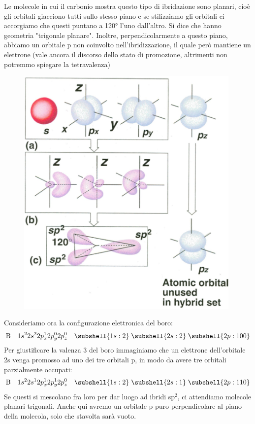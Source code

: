Le molecole in cui il carbonio mostra questo tipo di ibridazione sono planari, cioè gli orbitali giacciono tutti sullo stesso piano e se stilizziamo gli orbitali ci accorgiamo che questi puntano a 120° l'uno dall'altro. Si dice che hanno geometria "trigonale planare". Inoltre, perpendicolarmente a questo piano, abbiamo un orbitale p non coinvolto nell'ibridizzazione, il quale però mantiene un elettrone (vale ancora il discorso dello stato di promozione, altrimenti non potremmo spiegare la tetravalenza)

\begin{figure}[H]
    \centering
    \includegraphics[width=11cm]{immagini/orbitali-sp2.png}
\end{figure}

Consideriamo ora la configurazione elettronica del boro:
$$\text{B} \quad 1s^22s^22p_x^12p_y^02p_z^0 \quad \subshell{1s:2} \; \subshell{2s:2} \; \subshell{2p:100}$$
Per giustificare la valenza 3 del boro immaginiamo che un elettrone dell'orbitale 2s venga promosso ad uno dei tre orbitali p, in modo da avere tre orbitali parzialmente occupati: 
$$\text{B} \quad 1s^22s^12p_x^12p_y^12p_z^0 \quad \subshell{1s:2} \; \subshell{2s:1} \; \subshell{2p:110}
$$
Se questi si mescolano fra loro per dar luogo ad ibridi sp$^2$, ci attendiamo molecole planari trigonali. Anche qui avremo un orbitale p puro perpendicolare al piano della molecola, solo che stavolta sarà vuoto.

